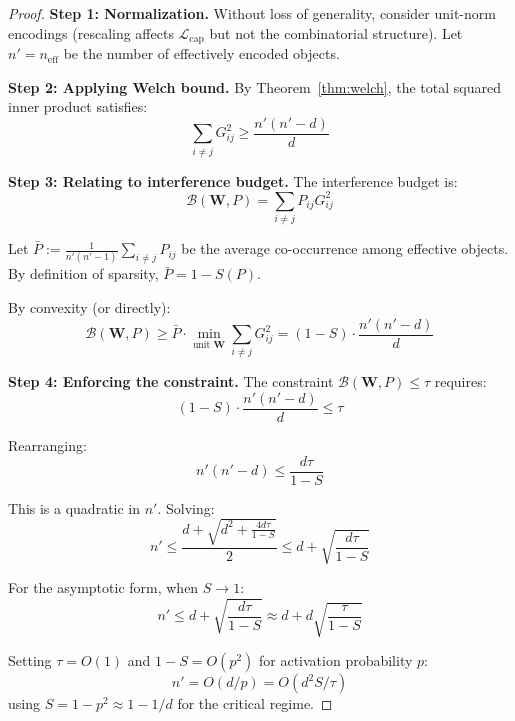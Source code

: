 \begin{proof}
\textbf{Step 1: Normalization.}
Without loss of generality, consider unit-norm encodings (rescaling affects $\mathcal{L}_{\text{cap}}$ but not the combinatorial structure). Let $n' = n_{\text{eff}}$ be the number of effectively encoded objects.

\textbf{Step 2: Applying Welch bound.}
By Theorem~\ref{thm:welch}, the total squared inner product satisfies:
\begin{equation}
\sum_{i \neq j} G_{ij}^2 \geq \frac{n'(n' - d)}{d}
\end{equation}

\textbf{Step 3: Relating to interference budget.}
The interference budget is:
\begin{equation}
\mathcal{B}(\mathbf{W}, P) = \sum_{i \neq j} P_{ij} G_{ij}^2
\end{equation}

Let $\bar{P} := \frac{1}{n'(n'-1)} \sum_{i \neq j} P_{ij}$ be the average co-occurrence among effective objects. By definition of sparsity, $\bar{P} = 1 - S(P)$.

By convexity (or directly):
\begin{equation}
\mathcal{B}(\mathbf{W}, P) \geq \bar{P} \cdot \min_{\text{unit } \mathbf{W}} \sum_{i \neq j} G_{ij}^2 = (1-S) \cdot \frac{n'(n'-d)}{d}
\end{equation}

\textbf{Step 4: Enforcing the constraint.}
The constraint $\mathcal{B}(\mathbf{W}, P) \leq \tau$ requires:
\begin{equation}
(1-S) \cdot \frac{n'(n'-d)}{d} \leq \tau
\end{equation}

Rearranging:
\begin{equation}
n'(n' - d) \leq \frac{d\tau}{1-S}
\end{equation}

This is a quadratic in $n'$. Solving:
\begin{equation}
n' \leq \frac{d + \sqrt{d^2 + \frac{4d\tau}{1-S}}}{2} \leq d + \sqrt{\frac{d\tau}{1-S}}
\end{equation}

For the asymptotic form, when $S \to 1$:
\begin{equation}
n' \leq d + \sqrt{\frac{d\tau}{1-S}} \approx d + d\sqrt{\frac{\tau}{1-S}}
\end{equation}

Setting $\tau = O(1)$ and $1-S = O(p^2)$ for activation probability $p$:
\begin{equation}
n' = O(d/p) = O(d^2 S / \tau)
\end{equation}
using $S = 1 - p^2 \approx 1 - 1/d$ for the critical regime.
\end{proof}

